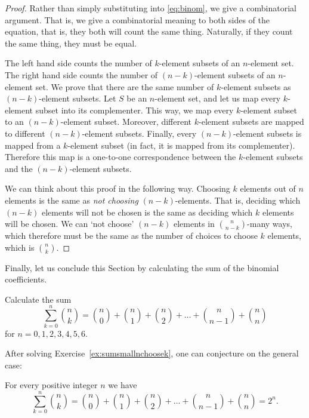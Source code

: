 \begin{proof}
Rather than simply substituting into \eqref{eq:binom}, 
we give a combinatorial argument. 
That is, we give a combinatorial meaning to both sides of the equation, 
that is, they both will count the same thing. 
Naturally, if they count the same thing, 
they must be equal. 

The left hand side counts the number of $k$-element subsets of an $n$-element set. 
The right hand side counts the number of $(n-k)$-element subsets of an $n$-element set. 
We prove that there are the same number of $k$-element subsets as $(n-k)$-element subsets. 
Let $S$ be an $n$-element set, 
and let us map every $k$-element subset into its complementer. 
This way, we map every $k$-element subset to an $(n-k)$-element subset. 
Moreover, different $k$-element subsets are mapped to different $(n-k)$-element subsets. 
Finally, every $(n-k)$-element subsets is mapped from a $k$-element subset 
(in fact, it is mapped from its complementer). 
Therefore this map is a one-to-one correspondence between the $k$-element subsets and the $(n-k)$-element subsets. 

We can think about this proof in the following way. 
Choosing $k$ elements out of $n$ elements is the same as \emph{not choosing} $(n-k)$-elements. 
That is, 
deciding which $(n-k)$ elements will not be chosen is the same as deciding which $k$ elements will be chosen. 
We can `not choose' $(n-k)$ elements in $\binom{n}{n-k}$-many ways, 
which therefore must be the same as the number of choices to choose $k$ elements,
which is $\binom{n}{k}$. 
\end{proof}

Finally, 
let us conclude this Section by calculating the sum of the binomial coefficients. 

\begin{exercise}\label{ex:sumsmallnchoosek}
Calculate the sum
\[
\sum_{k=0}^n \binom{n}{k} = \binom{n}{0} + \binom{n}{1} + \binom{n}{2} + \dots + \binom{n}{n-1} + \binom{n}{n} 
\]
for $n=0, 1, 2, 3, 4, 5, 6$. 
\end{exercise}

After solving Exercise~\ref{ex:sumsmallnchoosek}, 
one can conjecture on the general case: 

\begin{proposition}\label{prop:sumofbinomial}
For every positive integer $n$ we have 
\[
\sum_{k=0}^n \binom{n}{k} = \binom{n}{0} + \binom{n}{1} + \binom{n}{2} + \dots + \binom{n}{n-1} + \binom{n}{n} = 2^n. 
\]
\end{proposition}

